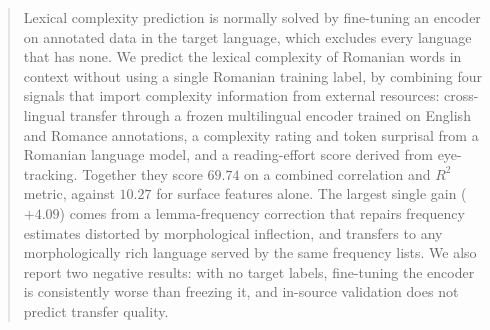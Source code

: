 \author{}



\maketitle
\begin{abstract}
Lexical complexity prediction is normally solved by fine-tuning an
encoder on annotated data in the target language, which excludes every
language that has none. We predict the lexical complexity of Romanian
words in context without using a single Romanian training label, by combining four signals that import complexity information from external resources: cross-lingual transfer through a frozen multilingual encoder
trained on English and Romance annotations, a complexity rating and
token surprisal from a Romanian language model, and a reading-effort
score derived from eye-tracking. Together they score $69.74$ on a
combined correlation and $R^2$ metric, against $10.27$ for surface
features alone. The largest single gain
($+4.09$) comes from a lemma-frequency correction that repairs frequency estimates distorted by morphological inflection, and transfers to any
morphologically rich language served by the same frequency lists. We
also report two negative results: with no target labels, fine-tuning
the encoder is consistently worse than freezing it, and in-source
validation does not predict transfer quality.
\end{abstract}

